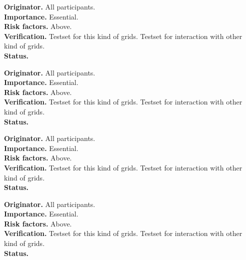 

\begin{reqlist}
{\bf Originator.} All participants. \\
{\bf Importance.} Essential. \\
{\bf Risk factors.} Above. \\
{\bf Verification.} Testset for this kind of grids. Testset for interaction 
with other kind of grids. \\
{\bf Status.} 
\end{reqlist}



\begin{reqlist}
{\bf Originator.} All participants. \\
{\bf Importance.} Essential. \\
{\bf Risk factors.} Above. \\
{\bf Verification.} Testset for this kind of grids. Testset for interaction 
with other kind of grids. \\
{\bf Status.} 
\end{reqlist}



\begin{reqlist}
{\bf Originator.} All participants. \\
{\bf Importance.} Essential. \\
{\bf Risk factors.} Above. \\
{\bf Verification.} Testset for this kind of grids. Testset for interaction 
with other kind of grids. \\
{\bf Status.} 
\end{reqlist}



\begin{reqlist}
{\bf Originator.} All participants. \\
{\bf Importance.} Essential. \\
{\bf Risk factors.} Above. \\
{\bf Verification.} Testset for this kind of grids. Testset for interaction 
with other kind of grids. \\
{\bf Status.} 
\end{reqlist}

